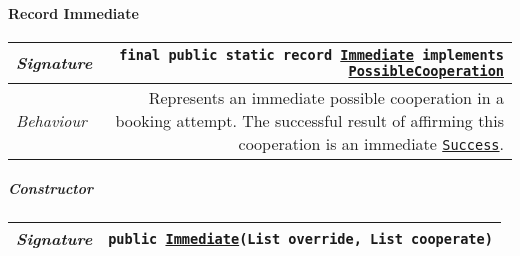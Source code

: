 \begin{adjustwidth}{1.5em}{0pt}
\begin{adjustwidth}{1.5em}{0pt}
\begin{adjustwidth}{1.5em}{0pt}
\begin{adjustwidth}{1.5em}{0pt}
\begin{adjustwidth}{1.5em}{0pt}
{\begin{tabularx}{1.0\linewidth}{@{}l R@{}}
          \end{tabularx}}
        \end{adjustwidth}
      \end{adjustwidth}\paragraph{Record Immediate\label{edu.kit.hci.soli.dto.BookingAttemptResult.PossibleCooperation.Immediate} }
      \begin{adjustwidth}{1.5em}{0pt}
        {\begin{tabularx}{1.0\linewidth}{@{}l R@{}}
          \emph{Signature} & \texttt{final public static  record \texttt{\hyperref[edu.kit.hci.soli.dto.BookingAttemptResult.PossibleCooperation.Immediate]{\texttt{Immediate}} implements \texttt{\hyperref[edu.kit.hci.soli.dto.BookingAttemptResult.PossibleCooperation]{\texttt{PossibleCooperation}}}}} \\
          \hline
          \emph{Behaviour} & Represents an immediate possible cooperation in a booking attempt. The successful result of affirming this cooperation is an immediate  \texttt{\hyperref[edu.kit.hci.soli.dto.BookingAttemptResult.Success]{\texttt{Success}}}.  \\
          \hline
  
        \end{tabularx}}\subparagraph{Constructor\label{edu.kit.hci.soli.dto.BookingAttemptResult.PossibleCooperation.Immediate@edu.kit.hci.soli.dto.BookingAttemptResult.PossibleCooperation.Immediate(java.util.List,java.util.List)}}
        \begin{adjustwidth}{1.5em}{0pt}
          {\begin{tabularx}{1.0\linewidth}{@{}l R@{}}
            \emph{Signature} & \texttt{public \texttt{\hyperref[edu.kit.hci.soli.dto.BookingAttemptResult.PossibleCooperation.Immediate]{\texttt{Immediate}}}(\texttt{List} override, \texttt{List} cooperate)} \\
            \hline
  

\end{tabularx}}
\end{adjustwidth}
\end{adjustwidth}
\end{adjustwidth}
\end{adjustwidth}
\end{adjustwidth}
